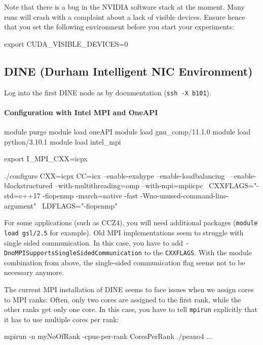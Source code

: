 Note that there is a bug in the NVIDIA software stack at the moment. 
Many runs will crash with a complaint about a lack of visible devices. 
Ensure hence that you set the following environment before you start your experiments:

\begin{bash}
export CUDA_VISIBLE_DEVICES=0
\end{bash}



\subsection{DINE (Durham Intelligent NIC Environment)}


Log into the first DINE node as by documentation (\texttt{ssh -X b101}).



\paragraph{Configuration with Intel MPI and OneAPI}

\begin{code}
module purge
module load oneAPI
module load gnu_comp/11.1.0
module load python/3.10.1
module load intel_mpi

export I_MPI_CXX=icpx

./configure CXX=icpx CC=icx --enable-exahype --enable-loadbalancing \
  --enable-blockstructured --with-multithreading=omp --with-mpi=mpiicpc \
  CXXFLAGS="-std=c++17 -fiopenmp -march=native -fast -Wno-unused-command-line-argument" \
  LDFLAGS="-fiopenmp"
\end{code}






\noindent
For some applications (such as CCZ4), you will need additional packages (\texttt{module load gsl/2.5} for example).
Old MPI implementations seem to struggle with single sided communication.
In this case, you have to add \texttt{-DnoMPISupportsSingleSidedCommunication} to the \texttt{CXXFLAGS}.
With the module combination from above, the single-sided communication flag seems not to be necessary anymore.

\begin{remark}
 The current MPI installation of DINE seems to face issues when we assign cores to MPI ranks:
 Often, only two cores are assigned to the first rank, while the other ranks get only one core.
 In this case, you have to tell \texttt{mpirun} explicitly that it has to use multiple cores per rank:
 \begin{code}
mpirun -n myNoOfRank -cpus-per-rank CoresPerRank ./peano4 ...
 \end{code}  
\end{remark}


